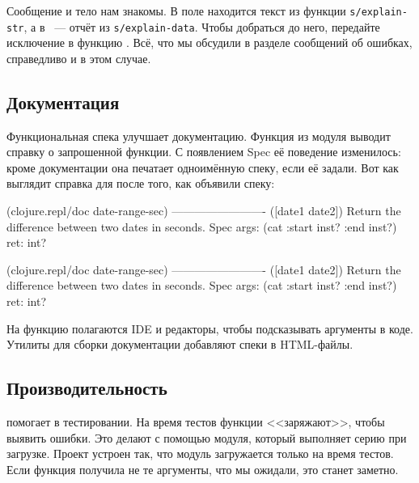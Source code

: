 Сообщение и тело нам знакомы. В поле  находится текст из функции
\texttt{s/ex\-plain-\-str}, а в ~--- отчёт из \texttt{s/ex\-plain-\-da\-ta}.
Чтобы добраться до него, передайте исключение в функцию . Всё,
что мы обсудили в разделе сообщений об ошибках, справедливо и в этом случае.

\subsection{Документация}


Функциональная спека улучшает документацию. Функция  из модуля
 выводит справку о запрошенной функции. С появлением Spec её
поведение изменилось: кроме документации она печатает одноимённую спеку, если её
задали. Вот как выглядит справка для  после того, как
объявили спеку:

\ifnarrow


\begin{clojure}
(clojure.repl/doc date-range-sec)
-------------------------
([date1 date2])
  Return the difference
            between two dates in seconds.
Spec
  args: (cat :start inst? :end inst?)
  ret: int?
\end{clojure}


\else


\begin{clojure}
(clojure.repl/doc date-range-sec)
-------------------------
([date1 date2])
  Return the difference between two dates in seconds.
Spec
  args: (cat :start inst? :end inst?)
  ret: int?
\end{clojure}


\fi

На функцию  полагаются IDE и редакторы, чтобы подсказывать аргументы в
коде. Утилиты для сборки документации добавляют спеки в HTML-файлы.

\subsection{Производительность}


 помогает в тестировании. На время тестов функции <<заряжают>>,
чтобы выявить ошибки. Это делают с помощью модуля, который выполняет серию
 при загрузке. Проект устроен так, что модуль загружается
только на время тестов. Если функция получила не те аргументы, что мы ожидали,
это станет заметно.

